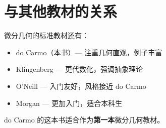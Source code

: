 \section{与其他教材的关系}

微分几何的标准教材还有：
\begin{itemize}
\item do Carmo（本书）— 注重几何直观，例子丰富
\item Klingenberg — 更代数化，强调抽象理论
\item O'Neill — 入门友好，风格接近 do Carmo
\item Morgan — 更加入门，适合本科生
\end{itemize}

do Carmo 的这本书适合作为\textbf{第一本}微分几何教材。

